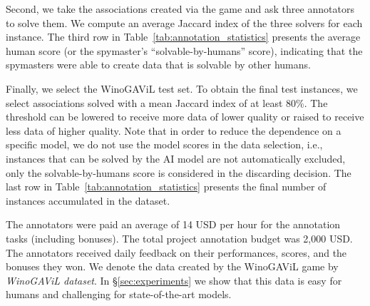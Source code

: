\documentclass{article}
\newcommand{\ouracronym}[0]{WinoGAViL}
\newcommand{\gamesplit}[0]{\emph{\textit{\ouracronym{}} dataset}}
\begin{document}
Second, we take the associations created via the game and ask three annotators to solve them. We compute an average Jaccard index of the three solvers for each instance. The third row in Table~\ref{tab:annotation_statistics} presents the average human score (or the spymaster's ``solvable-by-humans'' score), indicating that the spymasters were able to create data that is solvable by other humans.

Finally, we select the \ouracronym{} test set. To obtain the final test instances, we select associations solved with a mean Jaccard index of at least 80\%. The threshold can be lowered to receive more data of lower quality or raised to receive less data of higher quality. Note that in order to reduce the dependence on a specific model, we do not use the model scores in the data selection, i.e., instances that can be solved by the AI model are not automatically excluded, only the solvable-by-humans score is considered in the discarding decision. The last row in Table~\ref{tab:annotation_statistics} presents the final number of instances accumulated in the dataset.

The annotators were paid an average of 14 USD per hour for the annotation tasks (including bonuses). The total project annotation budget was 2,000 USD. The annotators received daily feedback on their performances, scores, and the bonuses they won. We denote the data created by the \ouracronym{} game by \gamesplit{}. 
In \S\ref{sec:experiments} we show that this data is easy for humans and challenging for state-of-the-art models. 
\end{document}
